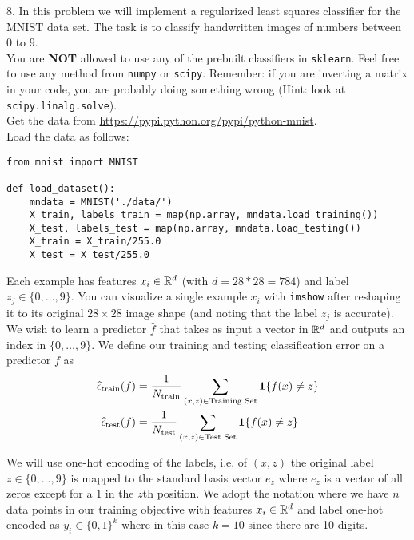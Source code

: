 8. In this problem we will implement a regularized least squares classifier for the MNIST data set. The task
is to classify handwritten images of numbers between $0$ to $9$.\\

You are \textbf{NOT} allowed to use
any of the prebuilt  classifiers in \verb|sklearn|.  Feel free to use any method from \verb|numpy|
or \verb|scipy|. Remember: if you are inverting a matrix in your code, you are probably doing something wrong (Hint: look at \verb|scipy.linalg.solve|).\\

Get the data from \url{https://pypi.python.org/pypi/python-mnist}. \\
Load the data as follows:
\begin{verbatim}
from mnist import MNIST

def load_dataset():
    mndata = MNIST('./data/')
    X_train, labels_train = map(np.array, mndata.load_training())
    X_test, labels_test = map(np.array, mndata.load_testing())
    X_train = X_train/255.0
    X_test = X_test/255.0
\end{verbatim}

Each example has features $x_i \in \mathbb{R}^d$ (with $d=28*28=784$) and label $z_j \in \{0,\dots,9\}$.  
You can visualize a single example $x_i$ with \texttt{imshow} after reshaping it to its original $28 \times 28$ image shape (and noting that the label $z_j$ is accurate).
We wish to learn a predictor $\widehat{f}$ that takes as input a vector in $\mathbb{R}^d$ and outputs an index in $\{0,\dots,9\}$.
We define our training and testing classification error on a predictor $f$ as
\begin{align*}
\widehat{\epsilon}_{\textrm{train}}(f) &=
\frac{1}{N _{\textrm{train}}} \sum_{(x,z)\in \textrm{Training Set}}     \mathbf{1}\{ f(x) \neq z \}
\\
  \widehat{\epsilon}_{\textrm{test}}(f) &=
  \frac{1}{N _{\textrm{test}}} \sum_{(x,z)\in \textrm{Test Set}}     \mathbf{1}\{ f(x) \neq z \} 
\end{align*}

We will use one-hot encoding of the labels, i.e. of $(x,z)$ the original label $z \in \{0, \ldots, 9\}$ is mapped to the standard basis vector $e_z$ where $e_z$ is a vector of all zeros except for a $1$ in the $z$th position.
We adopt the notation where we have $n$ data points in our training objective with features $x_i \in \mathbb{R}^d$ and label one-hot encoded as $y_i \in \{0,1\}^k$ where in this case $k=10$ since there are 10 digits.

